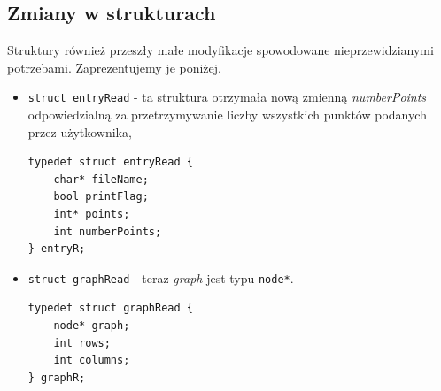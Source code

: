 \documentclass[10pt, a4paper]{report}
\begin{document}
    \subsection{Zmiany w strukturach}
    Struktury również przeszły małe modyfikacje spowodowane nieprzewidzianymi potrzebami. Zaprezentujemy je poniżej.
    \begin{itemize}
        \item \texttt{struct entryRead} - ta struktura otrzymała nową zmienną \textit{numberPoints} odpowiedzialną za przetrzymywanie liczby
        wszystkich punktów podanych przez użytkownika,
        \begin{lstlisting}
typedef struct entryRead {
    char* fileName;
    bool printFlag;
    int* points;
    int numberPoints;
} entryR;
        \end{lstlisting}
        \item \texttt{struct graphRead} - teraz \textit{graph} jest typu \texttt{node*}.
        \begin{lstlisting}
typedef struct graphRead {
    node* graph;
    int rows;
    int columns;
} graphR;
        \end{lstlisting}
    \end{itemize}
\end{document}
